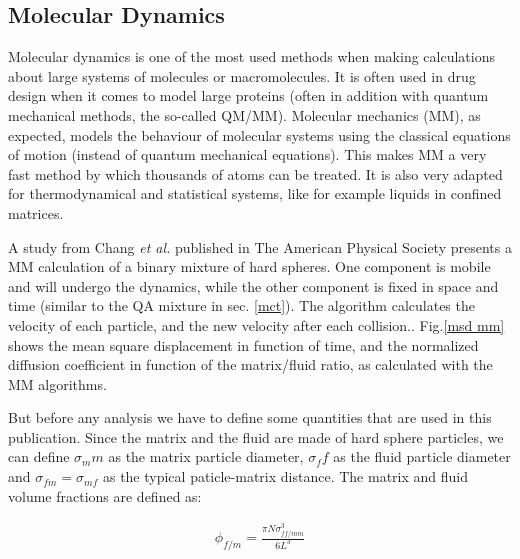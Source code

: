 \documentclass[a4paper,12pt]{article}
\newcommand{\jline}{\vspace{10pt}}
\newcommand{\etal}{\textit{et al.}}
\begin{document}
\subsection{Molecular Dynamics}

Molecular dynamics is one of the most used methods when making calculations about large systems of molecules or macromolecules. It is often used in drug design when it comes to model large proteins (often in addition with quantum mechanical methods, the so-called QM/MM). Molecular mechanics (MM), as expected, models the behaviour of molecular systems using the classical equations of motion (instead of quantum mechanical equations). This makes MM a very fast method by which thousands of atoms can be treated. It is also very adapted for thermodynamical and statistical systems, like for example liquids in confined matrices.\jline

A study from Chang \etal \cite{Chang2004} published in The American Physical Society presents a MM calculation of a binary mixture of hard spheres. One component is mobile and will undergo the dynamics, while the other component is fixed in space and time (similar to the QA mixture in sec. \ref{mct}). The algorithm calculates the velocity of each particle, and the new velocity after each collision.. Fig.\ref{msd mm} shows the mean square displacement in function of time, and the normalized diffusion coefficient in function of the matrix/fluid ratio, as calculated with the MM algorithms.\jline

But before any analysis we have to define some quantities that are used in this publication. Since the matrix and the fluid are made of hard sphere particles, we can define $\sigma_mm$ as the matrix particle diameter, $\sigma_ff$ as the fluid particle diameter and $\sigma_{fm} = \sigma_{mf}$ as the typical paticle-matrix distance. The matrix and fluid volume fractions are defined as:

\begin{align}
\phi_{f/m} = \frac{\pi N \sigma_{ff/mm}^3}{6L^3}
\end{align}
\end{document}
